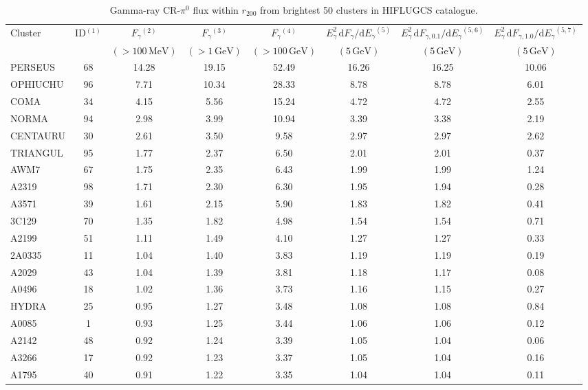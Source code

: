 \documentclass[10pt,aps,pra,reprint,amsmath,amsfonts,amssymb,showpacs,nofootinbib,floatfix]{revtex4-1}
\newcommand{\rmn}{\mathrm}
\newcommand{\dd}{\rmn{d}}
\newcommand{\rvir}{r_{200}}
\newcommand{\eg}{E_\gamma}
\begin{document}
\begin{table}
\begin{minipage}{2.0\columnwidth}
  \caption{Gamma-ray CR-$\pi^0$ flux within $\rvir$ from brightest 50 clusters in HIFLUGCS catalogue.}
\begin{tabular}{l c c c c c c c}
\hline
\hline
 Cluster & ID$^{(1)}$ & $F_{\gamma}$$^{(2)}$ & $F_{\gamma}$$^{(3)}$&
 $F_{\gamma}$$^{(4)}$ & $\eg^2\,\dd F_{\gamma}/\dd \eg$$^{(5)}$ &
 $\eg^2\,\dd F_{\gamma,0.1}/\dd \eg$$^{(5,6)}$ &
 $\eg^2\,\dd F_{\gamma,1.0}/\dd \eg$$^{(5,7)}$\\
  & & $(>100\,\rmn{MeV})$ & $(>1\,\rmn{GeV})$ & $(>100\,\rmn{GeV})$ &
 $(5\,\rmn{GeV})$ & $(5\,\rmn{GeV})$ & $(5\,\rmn{GeV})$\\
 \hline
PERSEUS & 68 & 14.28 & 19.15 & 52.49 & 16.26 & 16.25 & 10.06 \\
OPHIUCHU & 96 & 7.71 & 10.34 & 28.33 & 8.78 & 8.78 & 6.01 \\
COMA & 34 & 4.15 & 5.56 & 15.24 & 4.72 & 4.72 & 2.55 \\
NORMA & 94 & 2.98 & 3.99 & 10.94 & 3.39 & 3.38 & 2.19 \\
CENTAURU & 30 & 2.61 & 3.50 & 9.58 & 2.97 & 2.97 & 2.62 \\
TRIANGUL & 95 & 1.77 & 2.37 & 6.50 & 2.01 & 2.01 & 0.37 \\
AWM7 & 67 & 1.75 & 2.35 & 6.43 & 1.99 & 1.99 & 1.24 \\
A2319 & 98 & 1.71 & 2.30 & 6.30 & 1.95 & 1.94 & 0.28 \\
A3571 & 39 & 1.61 & 2.15 & 5.90 & 1.83 & 1.82 & 0.41 \\
3C129 & 70 & 1.35 & 1.82 & 4.98 & 1.54 & 1.54 & 0.71 \\
A2199 & 51 & 1.11 & 1.49 & 4.10 & 1.27 & 1.27 & 0.33 \\
2A0335 & 11 & 1.04 & 1.40 & 3.83 & 1.19 & 1.19 & 0.19 \\
A2029 & 43 & 1.04 & 1.39 & 3.81 & 1.18 & 1.17 & 0.08 \\
A0496 & 18 & 1.02 & 1.36 & 3.73 & 1.16 & 1.15 & 0.27 \\
HYDRA & 25 & 0.95 & 1.27 & 3.48 & 1.08 & 1.08 & 0.84 \\
A0085 & 1 & 0.93 & 1.25 & 3.44 & 1.06 & 1.06 & 0.12 \\
A2142 & 48 & 0.92 & 1.24 & 3.39 & 1.05 & 1.04 & 0.06 \\
A3266 & 17 & 0.92 & 1.23 & 3.37 & 1.05 & 1.04 & 0.16 \\
A1795 & 40 & 0.91 & 1.22 & 3.35 & 1.04 & 1.04 & 0.11 \\

\end{tabular}
\end{minipage}
\end{table}
\end{document}
